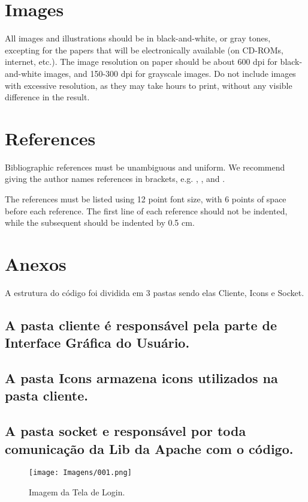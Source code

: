 \documentclass[12pt]{article}
\begin{document}
\section{Images}

All images and illustrations should be in black-and-white, or gray tones,
excepting for the papers that will be electronically available (on CD-ROMs,
internet, etc.). The image resolution on paper should be about 600 dpi for
black-and-white images, and 150-300 dpi for grayscale images.  Do not include
images with excessive resolution, as they may take hours to print, without any
visible difference in the result. 

\section{References}

Bibliographic references must be unambiguous and uniform.  We recommend giving
the author names references in brackets, e.g. \cite{knuth:84},
\cite{boulic:91}, and \cite{smith:99}.

The references must be listed using 12 point font size, with 6 points of space
before each reference. The first line of each reference should not be
indented, while the subsequent should be indented by 0.5 cm.




\section{Anexos}

A estrutura do código foi dividida em 3 pastas sendo elas Cliente, Icons e Socket.

 \subsection{A pasta cliente é responsável pela parte de Interface Gráfica do Usuário.}
 \subsection{A pasta Icons armazena icons utilizados na pasta cliente.}
 \subsection{A pasta socket e responsável por toda comunicação da Lib da Apache com o código.}


\begin{figure}[H]
	\centering
	\texttt{[image: Imagens/001.png]}
	\caption{ Imagem da Tela de Login.}
	\label{fig:01}
\end{figure}
\end{document}
